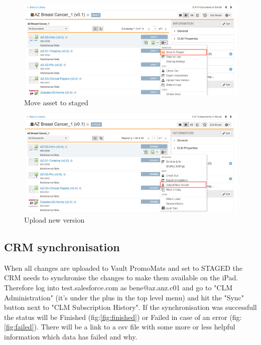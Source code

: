 \begin{center}
\begin{figure}[!htb]
\centering\includegraphics[width=\textwidth]{images/moveAssetToStaged.png} 
\caption{Move asset to staged} \label{fig:moveAssetToStaged}
\end{figure}
\end{center}



\begin{center}
\begin{figure}[!htb]
\centering\includegraphics[width=\textwidth]{images/uploadNewVersion.png} 
\caption{Upload new version} \label{fig:uploadNewVersion}
\end{figure}
\end{center}

\subsection{CRM synchronisation}

When all changes are uploaded to Vault PromoMats and set to STAGED the CRM needs to synchronise the changes to make them available on the iPad. Therefore log into test.salesforce.com as bene@az.anz.c01 and go to "CLM Administration" (it's under the plus in the top level menu) and hit the "Sync" button next to "CLM Subscription History". If the synchronisation was successfull the status will be Finished (fig:\ref{fig:finished}) or Failed in case of an error (fig:\ref{fig:failed}). There will be a link to a csv file with some more or less helpful information which data has failed and why. 

